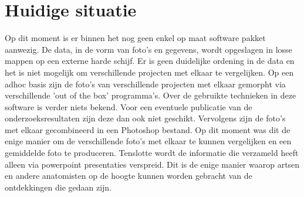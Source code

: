 \section{Huidige situatie}
\label{huidigesituatie}
Op dit moment is er binnen het \casamproject nog geen enkel op maat software pakket aanwezig.
De data, in de vorm van foto's en gegevens, wordt opgeslagen in losse mappen op een externe harde schijf. 
Er is geen duidelijke ordening in de data en het is niet mogelijk om verschillende projecten met elkaar te vergelijken.
Op een adhoc basis zijn de foto's van verschillende projecten met elkaar gemorpht via verschillende 'out of the box' programma's. 
Over de gebruikte technieken in deze software is verder niets bekend. Voor een eventuele publicatie van de onderzoeksresultaten zijn deze dan ook niet geschikt.
Vervolgens zijn de foto's met elkaar gecombineerd in een Photoshop bestand. Op dit moment was dit de enige manier om de verschillende foto's met elkaar te kunnen vergelijken en een gemiddelde foto te produceren.
Tenslotte wordt de informatie die \casam verzameld heeft alleen via powerpoint presentaties verspreid. 
Dit is de enige manier waarop artsen en andere anatomisten op de hoogte kunnen worden gebracht van de ontdekkingen die gedaan zijn.
